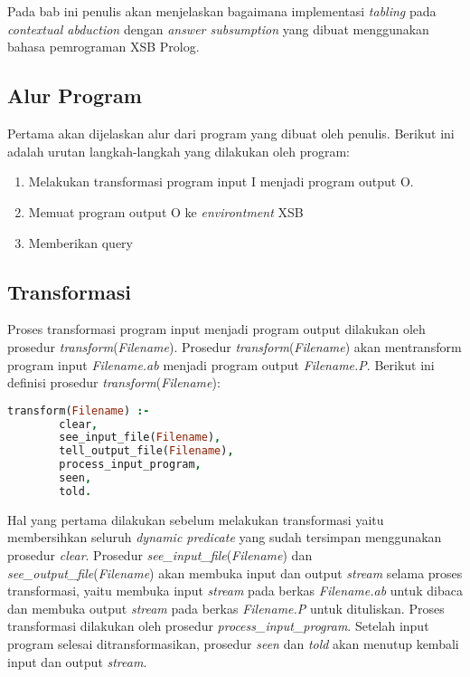 \chapter{\babTiga}
Pada bab ini penulis akan menjelaskan bagaimana implementasi \textit{tabling} pada \textit{contextual abduction} dengan \textit{answer subsumption} yang dibuat menggunakan bahasa pemrograman XSB Prolog.

\section{Alur Program}

Pertama akan dijelaskan alur dari program yang dibuat oleh penulis. Berikut ini adalah urutan langkah-langkah yang dilakukan oleh program:

\begin{enumerate}
	\item Melakukan transformasi program input \textsc{I} menjadi program output \textsc{O}.
	\item Memuat program output \textsc{O} ke \textit{environtment} XSB
	\item Memberikan query
\end{enumerate}

\section{Transformasi}

Proses transformasi program input menjadi program output dilakukan oleh prosedur \textit{transform}(\textit{Filename}). Prosedur \textit{transform}(\textit{Filename}) akan mentransform program input \textit{Filename.ab} menjadi program output \textit{Filename.P}. Berikut ini definisi prosedur \textit{transform}(\textit{Filename}): \\

\begin{lstlisting}[language=Prolog, caption=Prosedur \textit{transform}(\textit{Filename}),
tabsize=2,
frame=none,
captionpos=b]
transform(Filename) :-
		clear,
		see_input_file(Filename),
		tell_output_file(Filename),
		process_input_program,
		seen,
		told.
\end{lstlisting}

Hal yang pertama dilakukan sebelum melakukan transformasi yaitu membersihkan seluruh \textit{dynamic predicate} yang sudah tersimpan menggunakan prosedur \textit{clear}. 
Prosedur \textit{see\_input\_file}(\textit{Filename}) dan \textit{see\_output\_file}(\textit{Filename}) akan membuka input dan output \textit{stream} selama proses transformasi, yaitu membuka input \textit{stream} pada berkas \textit{Filename.ab} untuk dibaca dan membuka output \textit{stream} pada berkas \textit{Filename.P} untuk dituliskan. 
Proses transformasi dilakukan oleh prosedur \textit{process\_input\_program}. Setelah input program selesai ditransformasikan, prosedur \textit{seen} dan \textit{told} akan menutup kembali input dan output \textit{stream}.
